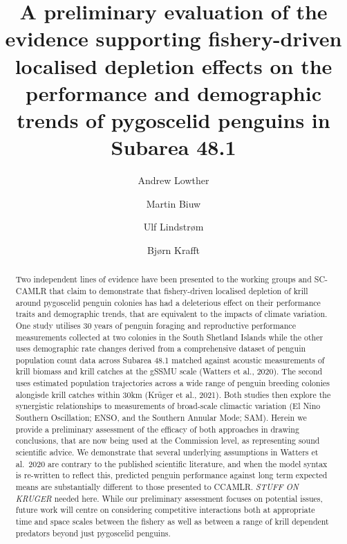 \documentclass[]{elsarticle} %
\begin{document}
\begin{frontmatter}

  \title{A preliminary evaluation of the evidence supporting fishery-driven
localised depletion effects on the performance and demographic trends of
pygoscelid penguins in Subarea 48.1}
    \author[Norwegian Polar Institute]{Andrew Lowther}
    \author[Institute of Marine Research (Tromsø)]{Martin Biuw}
    \author[Institute of Marine Research (Tromsø)]{Ulf Lindstrøm}
    \author[Institute of Marine Research (Bergen)]{Bjørn Krafft}
      \address[Norwegian Polar Institute]{Norwegian Polar Institute, Research Department, Fram Centre, Hjalmar
Johansensgata 14, Tromsø, Norway, 9297}
    \address[Institute of Marine Research (Tromsø)]{Institute of Marine Research, Tromsø 9296, Norway}
    \address[Institute of Marine Research (Bergen)]{Institute of Marine Research, Nordnesgaten 50, 5005 Bergen, Norway}
  
  \begin{abstract}
  Two independent lines of evidence have been presented to the working
  groups and SC-CAMLR that claim to demonstrate that fishery-driven
  localised depletion of krill around pygoscelid penguin colonies has had
  a deleterious effect on their performance traits and demographic trends,
  that are equivalent to the impacts of climate variation. One study
  utilises 30 years of penguin foraging and reproductive performance
  measurements collected at two colonies in the South Shetland Islands
  while the other uses demographic rate changes derived from a
  comprehensive dataset of penguin population count data across Subarea
  48.1 matched against acoustic measurements of krill biomass and krill
  catches at the gSSMU scale (Watters et al., 2020). The second uses
  estimated population trajectories across a wide range of penguin
  breeding colonies alongisde krill catches within 30km (Krüger et al.,
  2021). Both studies then explore the synergistic relationships to
  measurements of broad-scale climactic variation (El Nino Southern
  Oscillation; ENSO, and the Southern Annular Mode; SAM). Herein we
  provide a preliminary assessment of the efficacy of both approaches in
  drawing conclusions, that are now being used at the Commission level, as
  representing sound scientific advice. We demonstrate that several
  underlying assumptions in Watters et al.~2020 are contrary to the
  published scientific literature, and when the model syntax is re-written
  to reflect this, predicted penguin performance against long term
  expected means are substantially different to those presented to CCAMLR.
  \emph{STUFF ON KRUGER} needed here. While our preliminary assessment
  focuses on potential issues, future work will centre on considering
  competitive interactions both at appropriate time and space scales
  between the fishery as well as between a range of krill dependent
  predators beyond just pygoscelid penguins.
  \end{abstract}
  
 \end{frontmatter}
\end{document}
